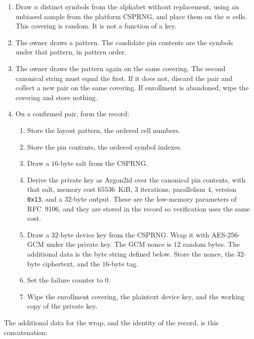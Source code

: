\documentclass[11pt]{article}
\begin{document}
\begin{enumerate}
  \item Draw \(n\) distinct symbols from the alphabet without replacement, using an unbiased sample from the platform CSPRNG, and place them on the \(n\) cells.
        This covering is random.
        It is not a function of a key.
  \item The owner draws a pattern.
        The candidate pin contents are the symbols under that pattern, in pattern order.
  \item The owner draws the pattern again on the same covering.
        The second canonical string must equal the first.
        If it does not, discard the pair and collect a new pair on the same covering.
        If enrollment is abandoned, wipe the covering and store nothing.
  \item On a confirmed pair, form the record:
        \begin{enumerate}
          \item Store the layout pattern, the ordered cell numbers.
          \item Store the pin contents, the ordered symbol indexes.
          \item Draw a \(16\)-byte salt from the CSPRNG.
          \item Derive the private key as Argon2id over the canonical pin contents, with that salt, memory cost \(65536\)~KiB, \(3\) iterations, parallelism \(4\), version \texttt{0x13}, and a \(32\)-byte output.
                These are the low-memory parameters of RFC~9106, and they are stored in the record so verification uses the same cost.
          \item Draw a \(32\)-byte device key from the CSPRNG.
                Wrap it with AES-256-GCM under the private key.
                The GCM nonce is \(12\) random bytes.
                The additional data is the byte string defined below.
                Store the nonce, the \(32\)-byte ciphertext, and the \(16\)-byte tag.
          \item Set the failure counter to \(0\).
          \item Wipe the enrollment covering, the plaintext device key, and the working copy of the private key.
        \end{enumerate}
\end{enumerate}

The additional data for the wrap, and the identity of the record, is this concatenation:
\end{document}
